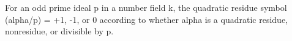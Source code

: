 For an odd prime ideal p in a number field k, the quadratic residue symbol (alpha/p) = +1, -1, or 0 according to whether alpha is a quadratic residue, nonresidue, or divisible by p.
